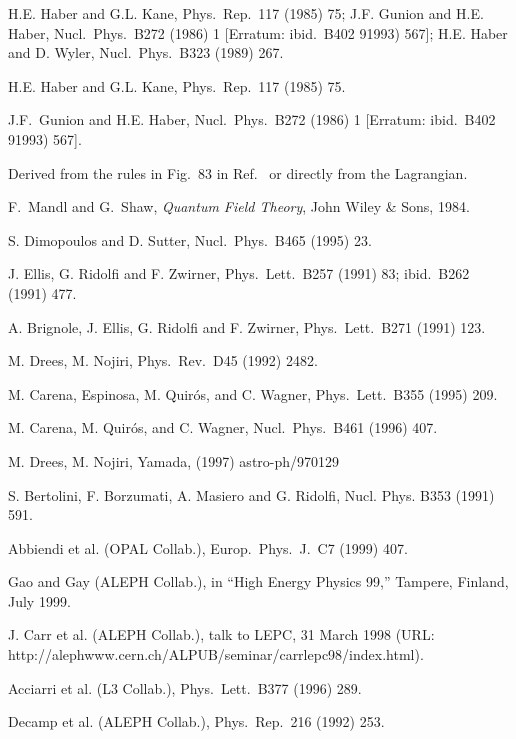 \begin{thebibliography}{99}
 H.E. Haber and G.L. Kane, Phys.\ Rep.\ 117 (1985) 75;
  J.F. Gunion and H.E. Haber, Nucl.\ Phys.\ B272 (1986) 1 [Erratum: ibid.\ B402
  91993) 567]; H.E. Haber and D. Wyler, Nucl.\ Phys.\ B323 (1989) 267.

 H.E. Haber and G.L. Kane, Phys.\ Rep.\ 117 (1985) 75.

  J.F.~Gunion and H.E. Haber, Nucl.\ Phys.\ B272 (1986) 1 [Erratum: ibid.\ B402
  91993) 567].

  Derived from the rules in Fig.~83 in Ref.~\cite{HaberKane} or
  directly from the Lagrangian.

  F.~Mandl and G.~Shaw, {\em Quantum Field Theory}, John Wiley \&
  Sons, 1984.

 S. Dimopoulos and D. Sutter, Nucl.\ Phys.\ B465
  (1995) 23.
  
 J. Ellis, G. Ridolfi and F. Zwirner, Phys.\ Lett.\ B257
  (1991) 83; ibid.\ B262 (1991) 477.
  
 A. Brignole, J. Ellis, G. Ridolfi and F. Zwirner, Phys.\ 
  Lett.\ B271 (1991) 123.
  
 M. Drees, M. Nojiri, Phys.\ Rev.\ D45 (1992) 2482.

 M. Carena, Espinosa, M. Quir\'os, and C. Wagner, Phys.\
  Lett.\ B355 (1995) 209.
  
 M. Carena, M. Quir\'os, and C. Wagner, Nucl.\ Phys.\ B461
  (1996) 407.

 M. Drees, M. Nojiri, Yamada, (1997) astro-ph/970129

\bibitem{bertolini91} S. Bertolini, F. Borzumati, A. Masiero and G. Ridolfi,
Nucl. Phys. B353 (1991) 591.

 Abbiendi et al. (OPAL Collab.), Europ.\ Phys.\ J.\ C7
  (1999) 407.

 Gao and Gay (ALEPH Collab.), in ``High Energy Physics 99,''
  Tampere, Finland, July 1999.
  
 J. Carr et al. (ALEPH Collab.), talk to LEPC, 31 March 1998
  (URL: http://alephwww.cern.ch/ALPUB/seminar/carrlepc98/index.html).
  
\bibitem{acciarri96} Acciarri et al. (L3 Collab.), Phys.\ Lett.\ B377 (1996)
  289.
  
 Decamp et al. (ALEPH Collab.), Phys.\ Rep.\ 216 (1992) 253.
  

\end{thebibliography}
